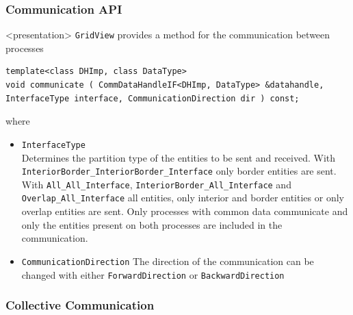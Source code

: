 \begin{frame}[fragile]
  \frametitle<presentation>{Communication API}
  \begin{onlyenv}<presentation>
  \texttt{GridView} provides a method for the communication between processes
    \begin{lstlisting}
template<class DHImp, class DataType>
void communicate ( CommDataHandleIF<DHImp, DataType> &datahandle, InterfaceType interface, CommunicationDirection dir ) const;
    \end{lstlisting}
where
    \end{onlyenv}
    \begin{itemize}
    \item \lstinline!InterfaceType!\\
    Determines the partition type of the entities to be sent and received. With \lstinline!InteriorBorder_InteriorBorder_Interface! only
border entities are sent. With \lstinline!All_All_Interface!,
    \lstinline!InteriorBorder_All_Interface! and
    \lstinline!Overlap_All_Interface! all entities, only interior and border entities or only overlap entities are sent. Only processes with common
data communicate and only the entities present on both processes are included in the communication.
    \item \lstinline!CommunicationDirection!
      The direction of the communication can be changed with either \lstinline!ForwardDirection! or
      \lstinline!BackwardDirection!
    \end{itemize}
\end{frame}



\subsubsection{Collective Communication}

